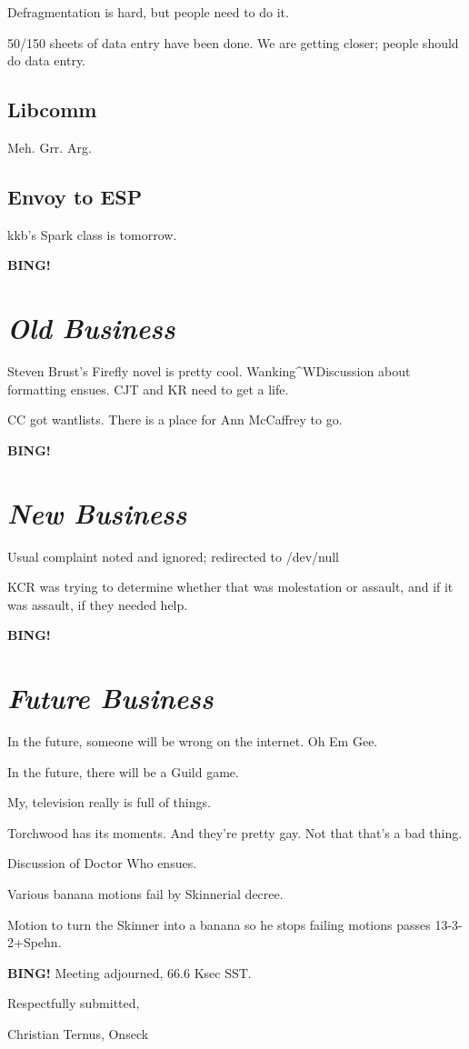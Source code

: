 \documentclass[10pt]{article}
\newcommand{\bing}{{\bf BING!} }
\newcommand{\goto}[1]{\bing \vskip 12pt \section*{{\em{#1}}}}
\begin{document}
Defragmentation is hard, but people need to do it.

50/150 sheets of data entry have been done.  We are getting closer; people should do data entry.

\subsection*{Libcomm}

Meh.  Grr.  Arg.

\subsection*{Envoy to ESP}

kkb's Spark class is tomorrow.

\goto{Old Business}

Steven Brust's Firefly novel is pretty cool.  Wanking^WDiscussion about formatting ensues.  CJT and KR need to get a life.

CC got wantlists.  There is a place for Ann McCaffrey to go.

\goto{New Business}

Usual complaint noted and ignored; redirected to /dev/null

KCR was trying to determine whether that was molestation or assault, and if it was assault, if they needed help.

\goto{Future Business}

In the future, someone will be wrong on the internet.  Oh Em Gee.

In the future, there will be a Guild game.

My, television really is full of things.

Torchwood has its moments.  And they're pretty gay.  Not that that's a bad thing.

Discussion of Doctor Who ensues.

Various banana motions fail by Skinnerial decree.

Motion to turn the Skinner into a banana so he stops failing motions passes 13-3-2+Spehn.

\bing
\noindent
Meeting adjourned, 66.6 Ksec SST.

\vspace{18pt}

\centerline{Respectfully submitted,}
\centerline{Christian Ternus, Onseck}
\end{document}
